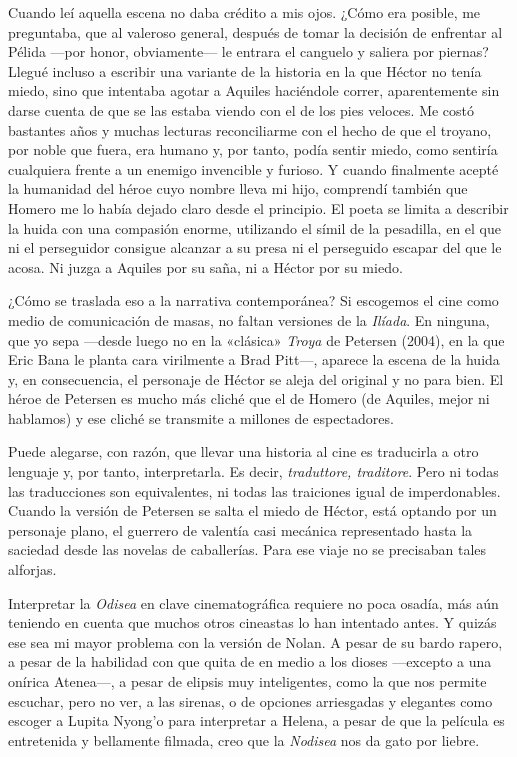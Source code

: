 Cuando leí aquella escena no daba crédito a mis ojos. ¿Cómo era posible, me preguntaba, que al valeroso general, después de tomar la decisión de enfrentar al Pélida ---por honor, obviamente--- le entrara el canguelo y saliera por piernas? Llegué incluso a escribir una variante de la historia en la que Héctor no tenía miedo, sino que intentaba agotar a Aquiles haciéndole correr, aparentemente sin darse cuenta de que se las estaba viendo con el de los pies veloces. Me costó bastantes años y muchas lecturas reconciliarme con el hecho de que el troyano, por noble que fuera, era humano y, por tanto, podía sentir miedo, como sentiría cualquiera frente a un enemigo invencible y furioso. Y cuando finalmente acepté la humanidad del héroe cuyo nombre lleva mi hijo, comprendí también que Homero me lo había dejado claro desde el principio. El poeta se limita a describir la huida con una compasión enorme, utilizando el símil de la pesadilla, en el que ni el perseguidor consigue alcanzar a su presa ni el perseguido escapar del que le acosa. Ni juzga a Aquiles por su saña, ni a Héctor por su miedo.

¿Cómo se traslada eso a la narrativa contemporánea? Si escogemos el cine como medio de comunicación de masas, no faltan versiones de la \emph{Ilíada}. En ninguna, que yo sepa ---desde luego no en la «clásica» \emph{Troya} de Petersen (2004), en la que Eric Bana le planta cara virilmente a Brad Pitt---, aparece la escena de la huida y, en consecuencia, el personaje de Héctor se aleja del original y no para bien. El héroe de Petersen es mucho más cliché que el de Homero (de Aquiles, mejor ni hablamos) y ese cliché se transmite a millones de espectadores.

Puede alegarse, con razón, que llevar una historia al cine es traducirla a otro lenguaje y, por tanto, interpretarla. Es decir, \emph{traduttore, traditore}. Pero ni todas las traducciones son equivalentes, ni todas las traiciones igual de imperdonables. Cuando la versión de Petersen se salta el miedo de Héctor, está optando por un personaje plano, el guerrero de valentía casi mecánica representado hasta la saciedad desde las novelas de caballerías. Para ese viaje no se precisaban tales alforjas.

Interpretar la \emph{Odisea} en clave cinematográfica requiere no poca osadía, más aún teniendo en cuenta que muchos otros cineastas lo han intentado antes. Y quizás ese sea mi mayor problema con la versión de Nolan. A pesar de su bardo rapero, a pesar de la habilidad con que quita de en medio a los dioses ---excepto a una onírica Atenea---, a pesar de elipsis muy inteligentes, como la que nos permite escuchar, pero no ver, a las sirenas, o de opciones arriesgadas y elegantes como escoger a Lupita Nyong'o para interpretar a Helena,
a pesar de que la película es entretenida y bellamente filmada, creo que la \emph{Nodisea} nos da gato por liebre.

